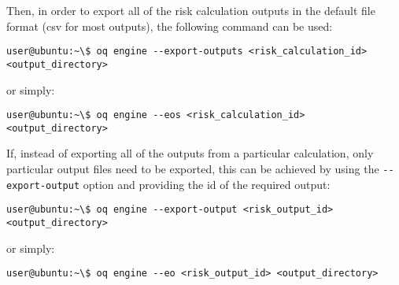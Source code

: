 Then, in order to export all of the risk calculation outputs in the
default file format (csv for most outputs), the following command can be used:

\begin{verbatim}
user@ubuntu:~\$ oq engine --export-outputs <risk_calculation_id> <output_directory>
\end{verbatim}

or simply:

\begin{verbatim}
user@ubuntu:~\$ oq engine --eos <risk_calculation_id> <output_directory>
\end{verbatim}

If, instead of exporting all of the outputs from a particular calculation,
only particular output files need to be exported, this can be achieved by
using the \Verb+--export-output+ option and providing the id of the required
output:

\begin{verbatim}
user@ubuntu:~\$ oq engine --export-output <risk_output_id> <output_directory>
\end{verbatim}

or simply:

\begin{verbatim}
user@ubuntu:~\$ oq engine --eo <risk_output_id> <output_directory>
\end{verbatim}